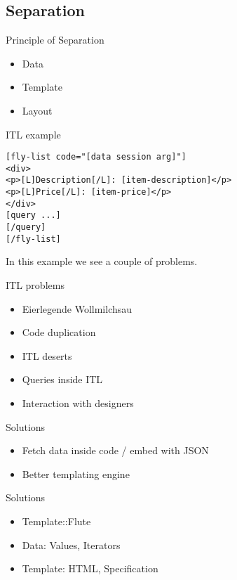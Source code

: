 \subsection{Separation}
\begin{frame}{Principle of Separation}
\begin{itemize}
\item Data
\item Template
\item Layout
\end{itemize}
\end{frame}

\begin{frame}[fragile]{ITL example}
\begin{lstlisting}
[fly-list code="[data session arg]"]
<div>
<p>[L]Description[/L]: [item-description]</p>
<p>[L]Price[/L]: [item-price]</p>
</div>
[query ...]
[/query]
[/fly-list]
\end{lstlisting}
\end{frame}

In this example we see a couple of problems.

\begin{frame}{ITL problems}
\begin{itemize}
\item Eierlegende Wollmilchsau
\item Code duplication
\item ITL deserts
\item Queries inside ITL
\item Interaction with designers
\end{itemize}
\end{frame}

\begin{frame}{Solutions}
\begin{itemize}
\item Fetch data inside code / embed with JSON
\item Better templating engine
\end{itemize}
\end{frame}

\begin{frame}{Solutions}
\begin{itemize}
\item Template::Flute
\item Data: Values, Iterators
\item Template: HTML, Specification
\end{itemize}
\end{frame}

